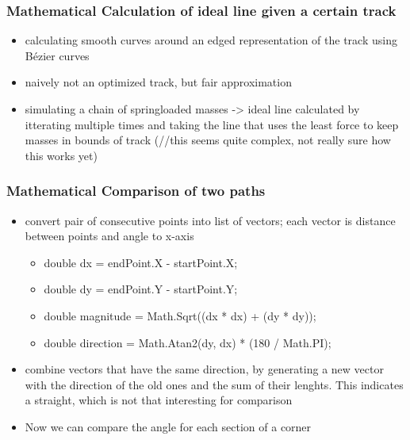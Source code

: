 \subsubsection{Mathematical Calculation of ideal line given a certain track}
\begin{itemize}
  \item calculating smooth curves around an edged representation of the track using Bézier curves
  \item naively not an optimized track, but fair approximation
  \item simulating a chain of springloaded masses -> ideal line calculated by itterating multiple times and taking the line that uses the least force to keep masses in bounds of track (//this seems quite complex, not really sure how this works yet)
\end{itemize}

\subsubsection{Mathematical Comparison of two paths}
\begin{itemize}
  \item convert pair of consecutive points into list of vectors; each vector is distance between points and angle to x-axis
  \begin{itemize}
    \item double dx = endPoint.X - startPoint.X;
    \item double dy = endPoint.Y - startPoint.Y;
    \item double magnitude = Math.Sqrt((dx * dx) + (dy * dy));
    \item double direction = Math.Atan2(dy, dx) * (180 / Math.PI);
  \end{itemize}
  \item combine vectors that have the same direction, by generating a new vector with the direction of the old ones and the sum of their lenghts. This indicates a straight, which is not that interesting for comparison
  \item Now we can compare the angle for each section of a corner
\end{itemize}
\clearpage
